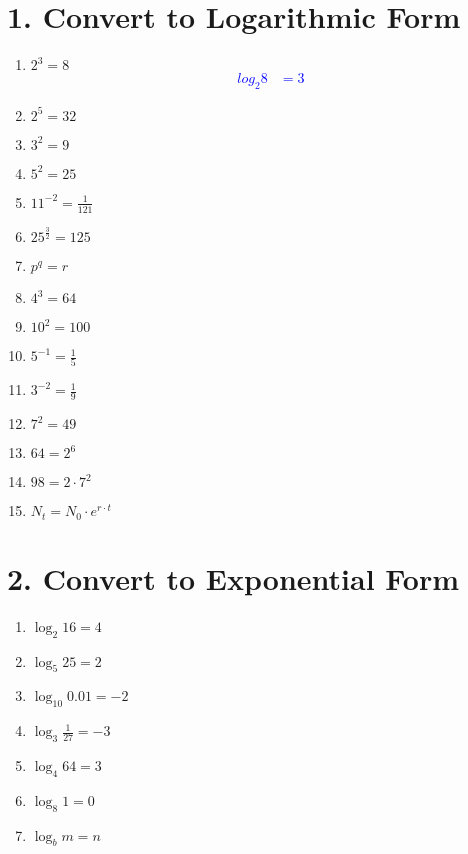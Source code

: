 \documentclass{hw}
\begin{document}
\section*{\normalsize 1. Convert to Logarithmic Form}
\begin{enumerate}[label=\alph*.]
    \item $ 2^3 = 8 $
    \textcolor{blue}{
        \begin{align*}
            log_2{8} &= 3
        \end{align*}
    }
    \item $ 2^5 = 32 $
        \studentlargeworkspace
    \item $ 3^2 = 9 $
        \studentlargeworkspace
    \item $ 5^2 = 25 $
        \studentlargeworkspace
    \item $ 11^{-2} = \frac{1}{121} $
        \studentlargeworkspace
    \item $ 25^{\frac{3}{2}} = 125 $
        \studentlargeworkspace
    \item $ p^q = r $
        \studentlargeworkspace
    \item $ 4^3 = 64 $
        \studentlargeworkspace
    \item $ 10^2 = 100 $
        \studentlargeworkspace
    \item $ 5^{-1} = \frac{1}{5} $
        \studentlargeworkspace
    \item $ 3^{-2} = \frac{1}{9} $
        \studentlargeworkspace
    \item $ 7^2 = 49 $
        \studentlargeworkspace
    \item $ 64 = 2^6 $
        \studentlargeworkspace
    \item $ 98 = 2 \cdot 7^2 $
        \studentlargeworkspace
    \item $ N_t = N_0 \cdot e^{r \cdot t} $
        \studentlargeworkspace
\end{enumerate}

\section*{\normalsize 2. Convert to Exponential Form}
\begin{enumerate}[label=\alph*.]
    \item $ \log_2 16 = 4 $
        \studentlargeworkspace
    \item $ \log_5 25 = 2 $
        \studentlargeworkspace
    \item $ \log_{10} 0.01 = -2 $
        \studentlargeworkspace
    \item $ \log_3 \frac{1}{27} = -3 $
        \studentlargeworkspace
    \item $ \log_4 64 = 3 $
        \studentlargeworkspace
    \item $ \log_8 1 = 0 $
        \studentlargeworkspace
    \item $ \log_b m = n $
        \studentlargeworkspace
\end{enumerate}
\end{document}

